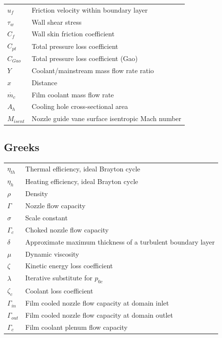 \documentclass[a4paper, 11pt, oneside]{report}
\begin{document}
\begin{table}[H]
\begin{center}
\begin{tabular}{ll}
$u_f$ & Friction velocity within boundary layer \\
$\tau_w$ & Wall shear stress \\
$C_f$ & Wall skin friction coefficient \\
$C_{pt}$ & Total pressure loss coefficient \\
$C_{Gao}$ & Total pressure loss coefficient (Gao) \\
$Y$ & Coolant/mainstream mass flow rate ratio \\
$x$ & Distance \\
$\dot{m_c}$ & Film coolant mass flow rate \\
$A_h$ & Cooling hole cross-sectional area \\
$M_{isent}$ & Nozzle guide vane surface isentropic Mach number
\end{tabular}
\end{center}
\end{table}

\subsection*{Greeks}
\begin{table}[H]
\begin{center}
\begin{tabular}{ll}
$\eta_{th}$ & Thermal efficiency, ideal Brayton cycle \\
$\eta_h$ & Heating efficiency, ideal Brayton cycle \\
$\rho$ & Density \\
$\Gamma$ & Nozzle flow capacity \\
$\sigma$ & Scale constant \\
$\Gamma_c$ & Choked nozzle flow capacity \\
$\delta$ & Approximate maximum thickness of a turbulent boundary layer \\
$\mu$ & Dynamic viscosity \\
$\zeta$ & Kinetic energy loss coefficient \\
$\lambda$ & Iterative substitute for $p_{0c}$ \\
$\zeta_c$ & Coolant loss coefficient \\
$\Gamma_{in}$ & Film cooled nozzle flow capacity at domain inlet \\
$\Gamma_{out}$ & Film cooled nozzle flow capacity at domain outlet \\
$\Gamma_c$ & Film coolant plenum flow capacity
\end{tabular}
\end{center}
\end{table}
\end{document}
